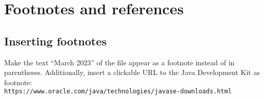 \section{Footnotes and references}

\subsection{Inserting footnotes}

Make the text \enquote{March 2023} of the file 
 appear as a footnote instead of in 
parentheses. Additionally, insert a clickable URL to the Java Development Kit 
as footnote: \\ \texttt{https://www.oracle.com/java/technologies/javase-downloads.html}
